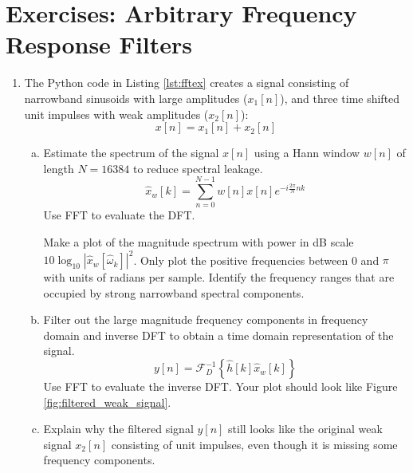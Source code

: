 \newpage
\section{Exercises: Arbitrary Frequency Response Filters}

\begin{enumerate}

    \item The Python code in Listing \ref{lst:fftex} creates a signal consisting of narrowband sinusoids with large amplitudes ($x_1[n]$), and three time shifted unit impulses with weak amplitudes ($x_2[n]$):
          \begin{equation}
              x[n] = x_1[n] + x_2[n]
          \end{equation}

          

          \begin{enumerate}[a)]
              \item Estimate the spectrum of the signal $x[n]$ using a Hann window $w[n]$ of length $N=16384$ to reduce spectral leakage.
                    \begin{equation}
                        \hat{x}_w[k]= \sum_{n=0}^{N-1}w[n]x[n]e^{-i\frac{2\pi}{N}nk}
                    \end{equation}
                    Use FFT to evaluate the DFT.

                    Make a plot of the magnitude spectrum with power in dB scale
                    $10\log_{10}|\hat{x}_w[\hat{\omega}_k]|^2$. Only plot the positive
                    frequencies between 0 and $\pi$ with units of radians per
                    sample. Identify the frequency ranges that are occupied by strong
                    narrowband spectral components.

              \item Filter out the large magnitude frequency components in
                    frequency domain and inverse DFT to obtain a time domain
                    representation of the signal.
                    \begin{equation}
                        y[n]= \mathcal{F}_D^{-1}\left\{ \hat{h}[k]\hat{x}_w[k] \right\}
                    \end{equation}
                    Use FFT to evaluate the inverse DFT. Your plot should look like
                    Figure \ref{fig:filtered_weak_signal}.

              \item Explain why the filtered signal $y[n]$ still looks like the
                    original weak signal $x_2[n]$ consisting of unit impulses, even
                    though it is missing some frequency components.
          \end{enumerate}

\end{enumerate}

